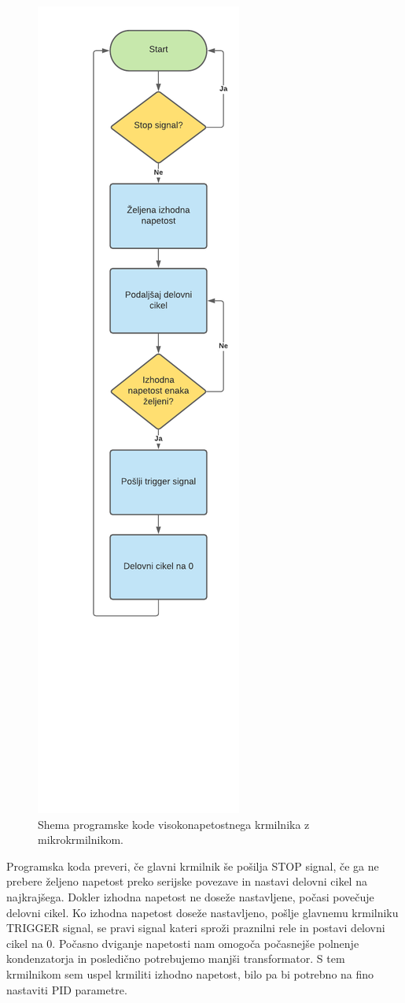 \documentclass[a4paper,twoside,openright,12pt,Slovene]{book}
\begin{document}
	\begin{figure}[H]
    \centering
    \includegraphics[width=0.35\columnwidth]{Sheme/KrmilnikzuCShema.pdf}
    \caption{\label{KrmilnikzuCShema} Shema programske kode visokonapetostnega krmilnika z mikrokrmilnikom.}
	\end{figure}
	
Programska koda preveri, če glavni krmilnik še pošilja STOP signal, če ga ne prebere željeno napetost preko serijske povezave in nastavi delovni cikel na najkrajšega. Dokler izhodna napetost ne doseže nastavljene, počasi povečuje delovni cikel. Ko izhodna napetost doseže nastavljeno, pošlje glavnemu krmilniku TRIGGER signal, se pravi signal kateri sproži praznilni rele in postavi delovni cikel na 0. Počasno dviganje napetosti nam omogoča počasnejše polnenje kondenzatorja in posledično potrebujemo manjši transformator. S tem krmilnikom sem uspel krmiliti izhodno napetost, bilo pa bi potrebno na fino nastaviti PID parametre.
\end{document}
